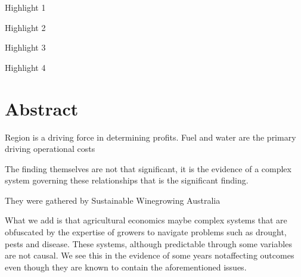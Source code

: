 \documentclass[review,12pt,authoryear]{elsarticle}
\begin{document}
\begin{linenumbers}
\begin{frontmatter}
\begin{highlights}
 \item Highlight 1
 \item Highlight 2
 \item Highlight 3
 \item Highlight 4
\end{highlights}
\end{frontmatter}


%







\section{Abstract}

Region is a driving force in determining profits.
Fuel and water are the primary driving operational costs

The finding themselves are not that significant, it is the evidence of a complex system governing these relationships that is the significant finding.

They were gathered by Sustainable Winegrowing Australia

What we add is that agricultural economics maybe complex systems that are obfuscated by the expertise of growers to navigate problems such as drought, pests and disease. These systems, although predictable through some variables are not causal. We see this in the evidence of some years notaffecting outcomes even though they are known to contain the aforementioned issues.


\end{linenumbers}
\end{document}
